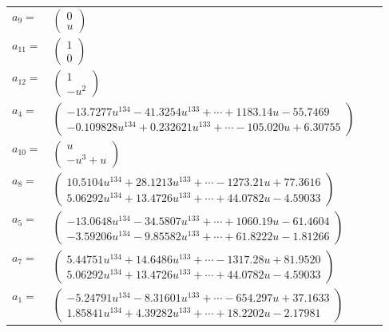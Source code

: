 \documentclass[1p]{elsarticle_modified}
\theoremstyle{definition}
\begin{document}
\begin{tabular}{m{7pt} m{180pt} m{7pt} m{180pt} }
\flushright $a_{9}=$&$\begin{pmatrix}0\\u\end{pmatrix}$ \\
\flushright $a_{11}=$&$\begin{pmatrix}1\\0\end{pmatrix}$ \\
\flushright $a_{12}=$&$\begin{pmatrix}1\\- u^2\end{pmatrix}$ \\
\flushright $a_{4}=$&$\begin{pmatrix}-13.7277 u^{134}-41.3254 u^{133}+\cdots+1183.14 u-55.7469\\-0.109828 u^{134}+0.232621 u^{133}+\cdots-105.020 u+6.30755\end{pmatrix}$ \\
\flushright $a_{10}=$&$\begin{pmatrix}u\\- u^3+u\end{pmatrix}$ \\
\flushright $a_{8}=$&$\begin{pmatrix}10.5104 u^{134}+28.1213 u^{133}+\cdots-1273.21 u+77.3616\\5.06292 u^{134}+13.4726 u^{133}+\cdots+44.0782 u-4.59033\end{pmatrix}$ \\
\flushright $a_{5}=$&$\begin{pmatrix}-13.0648 u^{134}-34.5807 u^{133}+\cdots+1060.19 u-61.4604\\-3.59206 u^{134}-9.85582 u^{133}+\cdots+61.8222 u-1.81266\end{pmatrix}$ \\
\flushright $a_{7}=$&$\begin{pmatrix}5.44751 u^{134}+14.6486 u^{133}+\cdots-1317.28 u+81.9520\\5.06292 u^{134}+13.4726 u^{133}+\cdots+44.0782 u-4.59033\end{pmatrix}$ \\
\flushright $a_{1}=$&$\begin{pmatrix}-5.24791 u^{134}-8.31601 u^{133}+\cdots-654.297 u+37.1633\\1.85841 u^{134}+4.39282 u^{133}+\cdots+18.2202 u-2.17981\end{pmatrix}$ \\

\end{tabular}
\end{document}
